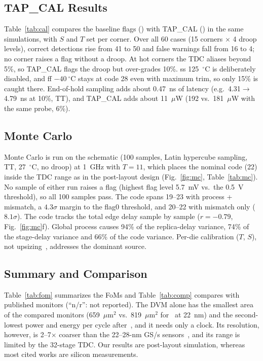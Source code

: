 \documentclass[conference]{IEEEtran}
\begin{document}
\subsection{TAP\_CAL Results}
Table~\ref{tab:cal} compares the baseline flags () with TAP\_CAL () in the same simulations, with $S$ and $T$ set per corner. Over all 60 cases (15 corners $\times$ 4 droop levels), correct detections rise from 41 to 50 and false warnings fall from 16 to 4; no corner raises a flag without a droop. At hot corners the TDC aliases beyond 5\%, so TAP\_CAL flags the droop but over-grades 10\%. ss 125~$^\circ$C is deliberately disabled, and ff $-40~^\circ$C stays at code 28 even with maximum trim, so only 15\% is caught there. End-of-hold sampling adds about 0.47~ns of latency (e.g.\ 4.31$\rightarrow$4.79~ns at 10\%, TT), and TAP\_CAL adds about 11~$\mu$W (192 vs.\ 181~$\mu$W with the same probe, 6\%).







\subsection{Monte Carlo}
Monte Carlo is run on the schematic (100 samples, Latin hypercube sampling, TT, 27~$^\circ$C, no droop) at 1~GHz with $T{=}11$, which places the nominal code (22) inside the TDC range as in the post-layout design (Fig.~\ref{fig:mc}, Table~\ref{tab:mc}). No sample of either run raises a flag (highest flag level 5.7~mV vs.\ the 0.5~V threshold), so all 100 samples pass. The code spans 19--23 with process + mismatch, a $4.3\sigma$ margin to the flag0 threshold, and 20--22 with mismatch only ($8.1\sigma$). The code tracks the total edge delay sample by sample ($r{=}{-}0.79$, Fig.~\ref{fig:mc}f). Global process causes 94\% of the replica-delay variance, 74\% of the stage-delay variance and 66\% of the code variance. Per-die calibration ($T$, $S$), not upsizing~\cite{pelgrom}, addresses the dominant source.





\subsection{Summary and Comparison}\label{sec:summary}
Table~\ref{tab:fom} summarizes the FoMs and Table~\ref{tab:comp} compares with published monitors (``n/r'': not reported). The DVM alone has the smallest area of the compared monitors (659~$\mu$m$^2$ vs.\ 819~$\mu$m$^2$ for~\cite{qian_iscas} at 22~nm) and the second-lowest power and energy per cycle after~\cite{shifman}, and it needs only a clock. Its resolution, however, is 2--7$\times$ coarser than the 22--28-nm GS/s sensors~\cite{whatmough_jssc,du_tcas,qian_iscas}, and its range is limited by the 32-stage TDC. Our results are post-layout simulation, whereas most cited works are silicon measurements.
\end{document}
